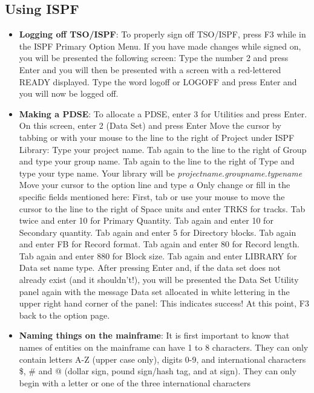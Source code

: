 \documentclass{report}
\begin{document}
    \subsection{Using ISPF}
    \begin{itemize}
        \item \textbf{Logging off TSO/ISPF}: To properly sign off TSO/ISPF, press F3 while in the ISPF Primary Option Menu. If you have made changes while signed on, you will be presented the following screen:
            \bigbreak \noindent 
            \bigbreak \noindent 
            Type the number 2 and press Enter and you will then be presented with a screen with a red-lettered READY displayed.
            \bigbreak \noindent 
            Type the word logoff or LOGOFF and press Enter and you will now be logged off.
        \item \textbf{Making a PDSE}: To allocate a PDSE, enter 3 for Utilities and press Enter. On this screen, enter 2 (Data Set) and press Enter 
            \bigbreak \noindent 
            Move the cursor by tabbing or with your mouse to the line to the right of Project under ISPF Library: Type your project name. Tab again to the line to the right of Group and type your group name. Tab again to the line to the right of Type and type your type name. Your library will be \textit{projectname.groupname.typename}
            \bigbreak \noindent 
            Move your cursor to the option line and type $a$
            \bigbreak \noindent 
            Only change or fill in the specific fields mentioned here: First, tab or use your mouse to move the cursor to the line to the right of Space units and enter TRKS for tracks. Tab twice and enter 10 for Primary Quantity. Tab again and enter 10 for Secondary quantity. Tab again and enter 5 for Directory blocks. Tab again and enter FB for Record format. Tab again and enter 80 for Record length. Tab again and enter 880 for Block size. Tab again and enter LIBRARY for Data set name type.
            \bigbreak \noindent 
            After pressing Enter and, if the data set does not already exist (and it shouldn't!), you will be presented the Data Set Utility panel again with the message Data set allocated in white lettering in the upper right hand corner of the panel: This indicates success! At this point, F3 back to the option page.
        \item \textbf{Naming things on the mainframe}: It is first important to know that names of entities on the mainframe can have 1 to 8 characters. They can only contain letters A-Z (upper case only), digits 0-9, and international characters \$, \# and @ (dollar sign, pound sign/hash tag, and at sign). They can only begin with a letter or one of the three international characters

\end{itemize}
\end{document}
